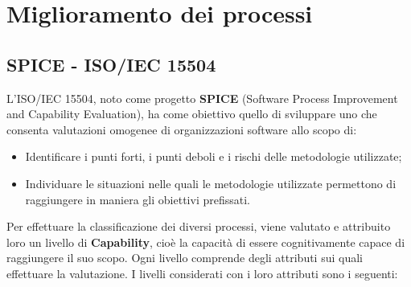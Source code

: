 \appendix
\section{Miglioramento dei processi} %
\subsection{SPICE - ISO/IEC 15504}  \label{spice}
L'ISO/IEC 15504, noto come progetto \textbf{SPICE} (Software Process Improvement and Capability Evaluation), ha come obiettivo quello di sviluppare uno  che consenta valutazioni omogenee di organizzazioni software allo scopo di:
\begin{itemize}
	\item Identificare i punti forti, i punti deboli e i rischi delle metodologie utilizzate;
	\item Individuare le situazioni nelle quali le metodologie utilizzate permettono di raggiungere in maniera  gli obiettivi prefissati.
\end{itemize}
Per effettuare la classificazione dei diversi processi, viene valutato e attribuito loro un livello di \textbf{Capability}, cioè la capacità di essere cognitivamente capace di raggiungere il suo scopo.
Ogni livello comprende degli attributi sui quali effettuare la valutazione.
I livelli considerati con i loro attributi sono i seguenti:
